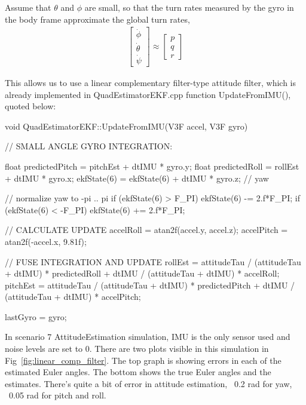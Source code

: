 \documentclass[letterpaper]{article}
\begin{document}
Assume that $\theta$ and $\phi$ are small, so that the turn rates measured by the gyro in the body frame approximate the global turn rates,
\begin{align*}
  \left[\begin{array}{c}\dot{\phi}\\\dot{\theta}\\\dot{\psi}\end{array}\right]
  \approx
  \left[\begin{array}{c}p\\q\\r\end{array}\right]  
\end{align*}

This allows us to use a linear complementary filter-type attitude filter, which is already implemented in QuadEstimatorEKF.cpp function UpdateFromIMU(), quoted below:

\begin{CPP}
void QuadEstimatorEKF::UpdateFromIMU(V3F accel, V3F gyro)
{
    // SMALL ANGLE GYRO INTEGRATION:

    float predictedPitch = pitchEst + dtIMU * gyro.y;
    float predictedRoll = rollEst + dtIMU * gyro.x;
    ekfState(6) = ekfState(6) + dtIMU * gyro.z;   // yaw

    // normalize yaw to -pi .. pi
    if (ekfState(6) > F_PI) ekfState(6) -= 2.f*F_PI;
    if (ekfState(6) < -F_PI) ekfState(6) += 2.f*F_PI;

    // CALCULATE UPDATE
    accelRoll = atan2f(accel.y, accel.z);
    accelPitch = atan2f(-accel.x, 9.81f);

    // FUSE INTEGRATION AND UPDATE
    rollEst = attitudeTau / (attitudeTau + dtIMU) * predictedRoll +
                  dtIMU / (attitudeTau + dtIMU) * accelRoll;
    pitchEst = attitudeTau / (attitudeTau + dtIMU) * predictedPitch +
                   dtIMU / (attitudeTau + dtIMU) * accelPitch;

    lastGyro = gyro;
}
\end{CPP}

In scenario 7 AttitudeEstimation simulation, IMU is the only sensor used and noise levels are set to 0. There are two plots visible in this simulation in Fig~\ref{fig:linear_comp_filter}. The top graph is showing errors in each of the estimated Euler angles. The bottom shows the true Euler angles and the estimates. There’s quite a bit of error in attitude estimation, ~0.2 rad for yaw, ~0.05 rad for pitch and roll.
\end{document}
